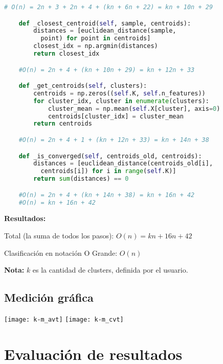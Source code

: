 \documentclass{article}
\begin{document}
\begin{lstlisting}[language=Python]
    # O(n) = 2n + 3 + 2n + 4 + (kn + 6n + 22) = kn + 10n + 29

    def _closest_centroid(self, sample, centroids):
        distances = [euclidean_distance(sample,
          point) for point in centroids]
        closest_idx = np.argmin(distances)
        return closest_idx

    #O(n) = 2n + 4 + (kn + 10n + 29) = kn + 12n + 33

    def _get_centroids(self, clusters):
        centroids = np.zeros((self.K, self.n_features))
        for cluster_idx, cluster in enumerate(clusters):
            cluster_mean = np.mean(self.X[cluster], axis=0)
            centroids[cluster_idx] = cluster_mean
        return centroids

    #O(n) = 2n + 4 + 1 + (kn + 12n + 33) = kn + 14n + 38

    def _is_converged(self, centroids_old, centroids):
        distances = [euclidean_distance(centroids_old[i],
          centroids[i]) for i in range(self.K)]
        return sum(distances) == 0

    #O(n) = 2n + 4 + (kn + 14n + 38) = kn + 16n + 42
    #O(n) = kn + 16n + 42

\end{lstlisting}

\textbf{Resultados:}

Total (la suma de todos los pasos): \(O(n) = kn + 16n + 42\)

Clasificación en notación O Grande: \(O(n)\)

\textbf{Nota: }\(k\) es la cantidad de clusters, definida por el usuario.

\subsection{Medición gráfica}

\begin{center}
  \texttt{[image: k-m\_avt]}
  \texttt{[image: k-m\_cvt]}
\end{center}

\section{Evaluación de resultados}
\end{document}
